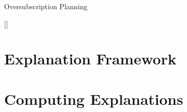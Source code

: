 \begin{frame}{Oversubscription Planning}

[\cite{smith:icaps-04,domshlak:mirkis:jair-15}]

\end{frame}



%

\section[Framework]{Explanation Framework}
\subsection*{}

\begin{frame}{}

\end{frame}



%

\section[Computing]{Computing Explanations}
\subsection*{}

\begin{frame}{}

\end{frame}



%

